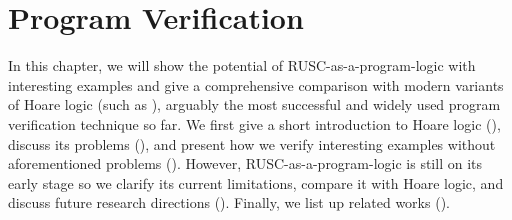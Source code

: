 \chapter{\;\;\;\;Program Verification}
\label{sec:program}

In this chapter, we will show the potential of RUSC-as-a-program-logic with interesting examples and give a comprehensive comparison with modern variants of Hoare logic (such as \cite{VST}), arguably the most successful and widely used program verification technique so far.
We first give a short introduction to Hoare logic (), discuss its problems (), and present how we verify interesting examples without aforementioned problems ().
However, RUSC-as-a-program-logic is still on its early stage so we clarify its current limitations, compare it with Hoare logic, and discuss future research directions ().
Finally, we list up related works ().








